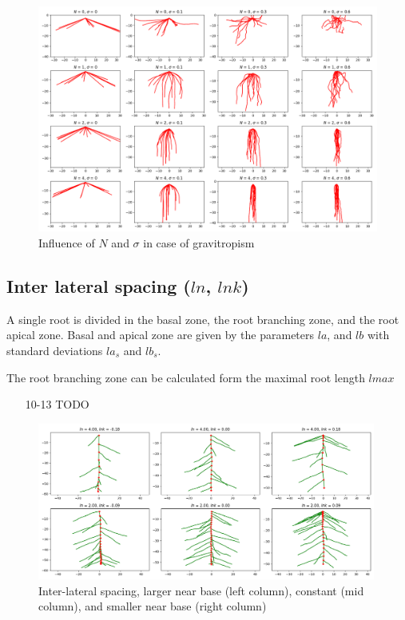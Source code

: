 \begin{figure}
\centering
\includegraphics[width=\textwidth]{fig_gravitropism.png}
\caption{Influence of $N$ and $\sigma$ in case of gravitropism} \label{fig:tropism}
\end{figure}




\subsection{Inter lateral spacing ($ln$, $lnk$)} \label{ssec:spacing}

A single root is divided in the basal zone, the root branching zone, and the root apical zone. Basal and apical zone are given by the parameters $la$, and $lb$ with standard deviations $la_s$ and $lb_s$. 

The root branching zone can be calculated form the maximal root length $lmax$



\begin{itemize}
\item[10-13] TODO
\end{itemize}

\begin{figure}
\centering
\includegraphics[width=0.99\textwidth]{fig_lateralspacing.png}
\caption{Inter-lateral spacing, larger near base (left column), constant (mid column), and smaller near base (right column) } \label{fig:spacing}
\end{figure}



